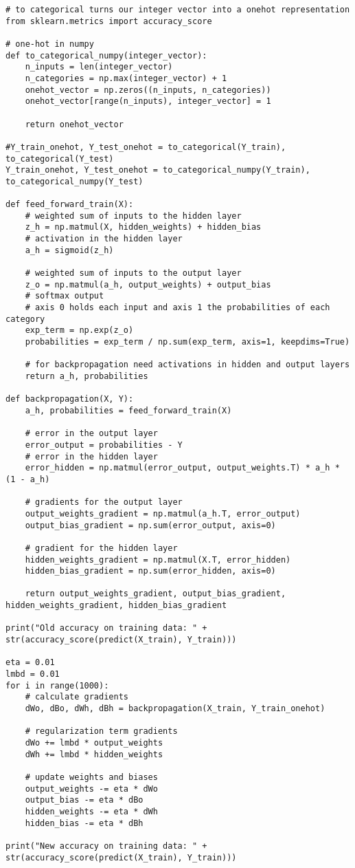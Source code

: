 \begin{verbatim}
# to categorical turns our integer vector into a onehot representation
from sklearn.metrics import accuracy_score

# one-hot in numpy
def to_categorical_numpy(integer_vector):
    n_inputs = len(integer_vector)
    n_categories = np.max(integer_vector) + 1
    onehot_vector = np.zeros((n_inputs, n_categories))
    onehot_vector[range(n_inputs), integer_vector] = 1
    
    return onehot_vector

#Y_train_onehot, Y_test_onehot = to_categorical(Y_train), to_categorical(Y_test)
Y_train_onehot, Y_test_onehot = to_categorical_numpy(Y_train), to_categorical_numpy(Y_test)

def feed_forward_train(X):
    # weighted sum of inputs to the hidden layer
    z_h = np.matmul(X, hidden_weights) + hidden_bias
    # activation in the hidden layer
    a_h = sigmoid(z_h)
    
    # weighted sum of inputs to the output layer
    z_o = np.matmul(a_h, output_weights) + output_bias
    # softmax output
    # axis 0 holds each input and axis 1 the probabilities of each category
    exp_term = np.exp(z_o)
    probabilities = exp_term / np.sum(exp_term, axis=1, keepdims=True)
    
    # for backpropagation need activations in hidden and output layers
    return a_h, probabilities

def backpropagation(X, Y):
    a_h, probabilities = feed_forward_train(X)
    
    # error in the output layer
    error_output = probabilities - Y
    # error in the hidden layer
    error_hidden = np.matmul(error_output, output_weights.T) * a_h * (1 - a_h)
    
    # gradients for the output layer
    output_weights_gradient = np.matmul(a_h.T, error_output)
    output_bias_gradient = np.sum(error_output, axis=0)
    
    # gradient for the hidden layer
    hidden_weights_gradient = np.matmul(X.T, error_hidden)
    hidden_bias_gradient = np.sum(error_hidden, axis=0)

    return output_weights_gradient, output_bias_gradient, hidden_weights_gradient, hidden_bias_gradient

print("Old accuracy on training data: " + str(accuracy_score(predict(X_train), Y_train)))

eta = 0.01
lmbd = 0.01
for i in range(1000):
    # calculate gradients
    dWo, dBo, dWh, dBh = backpropagation(X_train, Y_train_onehot)
    
    # regularization term gradients
    dWo += lmbd * output_weights
    dWh += lmbd * hidden_weights
    
    # update weights and biases
    output_weights -= eta * dWo
    output_bias -= eta * dBo
    hidden_weights -= eta * dWh
    hidden_bias -= eta * dBh

print("New accuracy on training data: " + str(accuracy_score(predict(X_train), Y_train)))

\end{verbatim}



